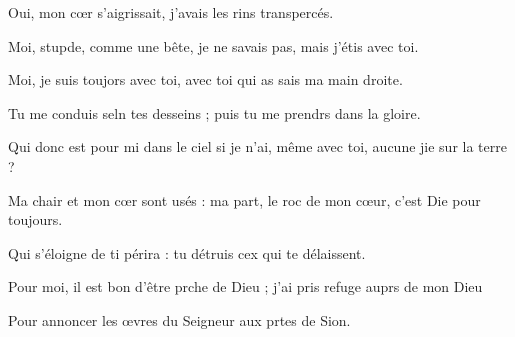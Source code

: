 \item Oui, mon cœr s’aigrissait, j’avais les rins transpercés.
\item Moi, stupde, comme une bête, je ne savais pas, mais j’étis avec toi.
\item Moi, je suis toujors avec toi, avec toi qui as sais ma main droite.
\item Tu me conduis seln tes desseins ; puis tu me prendrs dans la gloire.
\item Qui donc est pour mi dans le ciel si je n’ai, même avec toi, aucune jie sur la terre ?
\item Ma chair et mon cœr sont usés : ma part, le roc de mon cœur, c’est Die pour toujours.
\item Qui s’éloigne de ti périra : tu détruis cex qui te délaissent.
\item Pour moi, il est bon d’être prche de Dieu ; j’ai pris refuge auprs de mon Dieu
\item Pour annoncer les œvres du Seigneur aux prtes de Sion.